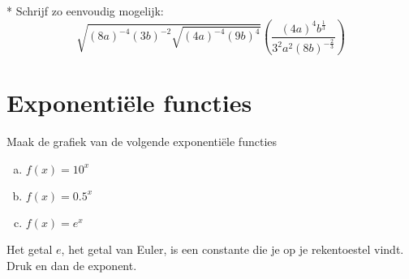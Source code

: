 \documentclass[12pt,twoside]{article}
\begin{document}
\begin{oefening}*
Schrijf zo eenvoudig mogelijk:
$$\sqrt{\left(8a\right)^{-4}\left(3b\right)^{-2}\sqrt{\left(4a\right)^{-4}\left(9b\right)^4}}\left(\dfrac{\left(4a\right)^4b^{\frac{1}{3}}}{3^2a^2\left(8b\right)^{-\frac{2}{3}}}\right)$$
\end{oefening}

\pagebreak
\section{Exponentiële functies}

\begin{oefening}
Maak de grafiek van de volgende exponentiële functies
\begin{multicols}{3}
\begin{enumerate}[(a)]
  \item $f(x)=10^x$
  \item $f(x)=0.5^x$
  \item $f(x)=e^x$
\end{enumerate}
\end{multicols}
Het getal $e$, het getal van Euler, is een constante die je op je rekentoestel vindt. Druk   en dan de exponent.
\end{oefening}
\end{document}
